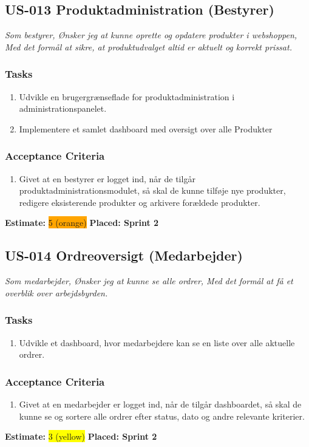 \subsection{US-013 Produktadministration (Bestyrer)}
\label{sec:US-013}
\textit{Som bestyrer, Ønsker jeg at kunne oprette og opdatere produkter i webshoppen, Med det formål at sikre, at produktudvalget altid er aktuelt og korrekt prissat.}
\subsubsection*{\textbf{Tasks}}
\begin{enumerate}
  \item Udvikle en brugergrænseflade for produktadministration i administrationspanelet.
  \item Implementere et samlet dashboard med oversigt over alle Produkter
\end{enumerate}
\subsubsection*{\textbf{Acceptance Criteria}}
\begin{enumerate}
  \item Givet at en bestyrer er logget ind, når de tilgår produktadministrationsmodulet, så skal de kunne tilføje nye produkter, redigere eksisterende produkter og arkivere forældede produkter.
\end{enumerate}
\textbf{Estimate:} \colorbox{orange}{5 (orange)}
\textbf{Placed: Sprint 2}
\par\noindent\dotfill

\subsection{US-014 Ordreoversigt (Medarbejder)}
\label{sec:US-014}
\textit{Som medarbejder, Ønsker jeg at kunne se alle ordrer, Med det formål at få et overblik over arbejdsbyrden.}
\subsubsection*{\textbf{Tasks}}
\begin{enumerate}
  \item Udvikle et dashboard, hvor medarbejdere kan se en liste over alle aktuelle ordrer.
\end{enumerate}
\subsubsection*{\textbf{Acceptance Criteria}}
\begin{enumerate}
  \item Givet at en medarbejder er logget ind, når de tilgår dashboardet, så skal de kunne se og sortere alle ordrer efter status, dato og andre relevante kriterier.
\end{enumerate}
\textbf{Estimate:} \colorbox{yellow}{3 (yellow)}
\textbf{Placed: Sprint 2}
\par\noindent\dotfill

